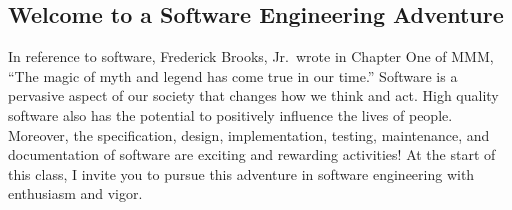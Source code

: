 \subsection*{Welcome to a Software Engineering Adventure}

In reference to software, Frederick Brooks, Jr.\ wrote in Chapter One of MMM, ``The magic of myth and legend has come true
in our time.'' Software is a pervasive aspect of our society that changes how we think and act.  High quality software
also has the potential to positively influence the lives of people. Moreover, the specification, design, implementation,
testing, maintenance, and documentation of software are exciting and rewarding activities!  At the start of this class,
I invite you to pursue this adventure in software engineering with enthusiasm and vigor.


